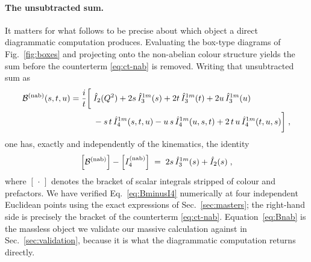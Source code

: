 \documentclass[11pt,a4paper]{article}
\newcommand{\Ihat}{\hat{I}}
\begin{document}
\paragraph{The unsubtracted sum.}
It matters for what follows to be precise about which object a direct
diagrammatic computation produces. Evaluating the box-type diagrams of
Fig.~\ref{fig:boxes} and projecting onto the non-abelian colour structure yields
the sum  {before} the counterterm \eqref{eq:ct-nab} is removed. Writing that
unsubtracted sum as
\begin{equation}
\begin{split}
  \mathcal{B}^{\rm(nab)}(s,t,u)=\frac{i}{t}\bigg[\;&\Ihat_2(Q^2)
   +2s\,\Ihat_3^{1m}(s)+2t\,\Ihat_3^{1m}(t)+2u\,\Ihat_3^{1m}(u)\\
  &-s\,t\,\Ihat_4^{1m}(s,t,u)-u\,s\,\Ihat_4^{1m}(u,s,t)
   +2\,t\,u\,\Ihat_4^{1m}(t,u,s)\bigg]\;,
\end{split}
\label{eq:Bnab}
\end{equation}
one has, exactly and independently of the kinematics, the identity
\begin{equation}
  \Big[\mathcal{B}^{\rm(nab)}\Big]-\Big[I_4^{\rm(nab)}\Big]
  \;=\;2s\,\Ihat_3^{1m}(s)+\Ihat_2(s)\;,
  \label{eq:BminusI4}
\end{equation}
where $[\,\cdot\,]$ denotes the bracket of scalar integrals stripped of colour and
prefactors. We have verified Eq.~\eqref{eq:BminusI4} numerically at four
independent Euclidean points using the exact expressions of
Sec.~\ref{sec:masters}; the right-hand side is precisely the bracket of the
counterterm \eqref{eq:ct-nab}. Equation~\eqref{eq:Bnab} is the massless object we
validate our massive calculation against in Sec.~\ref{sec:validation}, because it
is what the diagrammatic computation returns directly.

\end{document}
